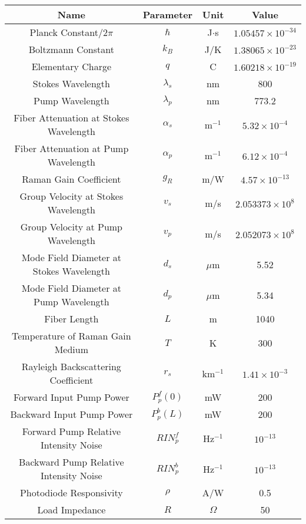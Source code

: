 \documentclass[10pt,letterpaper]{article}
\begin{document}
\begin{table}[t]
\begin{centering}
\begin{tabular}{|c|c|c|c|} \hline
Name & Parameter & Unit & Value\\ \hline\hline
Planck Constant$/2\pi$ & $\hbar$ & J$\cdot$s & $1.05457 \times 10^{-34}$ \\ \hline
Boltzmann Constant & $k_B$ & J/K & $1.38065 \times 10^{-23}$  \\ \hline
Elementary Charge & $q$ & C & $1.60218 \times 10^{-19}$  \\ \hline 
Stokes Wavelength & $\lambda_s$ & nm & 800 \\ \hline
Pump Wavelength & $\lambda_p$ & nm & 773.2 \\ \hline
Fiber Attenuation at Stokes Wavelength & $\alpha_s$ & m$^{-1}$ & $5.32 \times 10^{-4}$ \\ \hline
Fiber Attenuation at Pump Wavelength & $\alpha_p$ & m$^{-1}$ & $6.12 \times 10^{-4}$ \\ \hline
Raman Gain Coefficient & $g_R$ & m/W & $4.57 \times 10^{-13}$ \\ \hline
Group Velocity at Stokes Wavelength & $v_s$ & m/s & $2.053373 \times 10^8$ \\ \hline
Group Velocity at Pump Wavelength & $v_p$ & m/s & $2.052073 \times 10^8$ \\ \hline
Mode Field Diameter at Stokes Wavelength & $d_s$ & $\mu$m & 5.52 \\ \hline
Mode Field Diameter at Pump Wavelength & $d_p$ & $\mu$m & 5.34 \\ \hline
Fiber Length & $L$ & m & 1040 \\ \hline
Temperature of Raman Gain Medium & $T$ & K & 300 \\ \hline
Rayleigh Backscattering Coefficient & $r_s$ & km$^{-1}$ & $1.41 \times 10^{-3}$ \\ \hline
Forward Input Pump Power & $P_p^f(0)$ & mW & 200 \\ \hline
Backward Input Pump Power & $P_p^b(L)$ & mW & 200 \\ \hline
Forward Pump Relative Intensity Noise & $RIN_p^f$ & Hz$^{-1}$ & $10^{-13}$ \\ \hline
Backward Pump Relative Intensity Noise & $RIN_p^b$ & Hz$^{-1}$ & $10^{-13}$ \\ \hline
Photodiode Responsivity & $\rho$ & A/W & 0.5 \\ \hline
Load Impedance & $R$ & $\Omega$ & 50\\ \hline

\end{tabular}
\end{centering}
\end{table}
\end{document}
